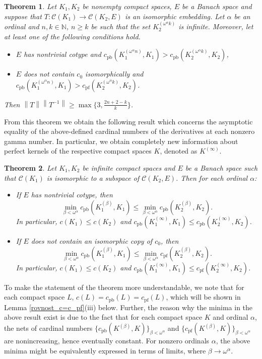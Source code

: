 \documentclass{amsart}
\numberwithin{equation}{section}
\newtheorem{thm}{Theorem}[section]
\theoremstyle{definition}
\def\C{\mathcal C}
\def\en{\mathbb N}
\newcommand{\norm}[1]{\left\|#1\right\|}
\begin{document}
\begin{thm}
\label{core}
Let $K_1, K_2$ be nonempty compact spaces, $E$ be a Banach space and suppose that $T:\C(K_1) \rightarrow \C(K_2, E)$ is an isomorphic embedding. Let $\alpha$ be an ordinal and $n, k \in \en$, $n \geq k$ be such that the set $K_2^{(\omega^{\alpha}k)}$ is infinite.
Moreover, let at least one of the following conditions hold. 
\begin{itemize}
    \item[(i)] $E$ has nontrivial cotype and $c_{\text{pb}}(K_1^{(\omega^{\alpha}n)}, K_1)>c_{\text{pb}}(K_2^{(\omega^{\alpha}k)}, K_2)$,
    \item[(ii)] $E$ does not contain $c_0$ isomorphically and $c_{\text{pb}}(K_1^{(\omega^{\alpha}n)}, K_1)>c_{\text{pf}}(K_2^{(\omega^{\alpha}k)}, K_2)$.
\end{itemize}
	Then $\norm{T}\norm{T^{-1}}\geq \max \{3, \frac{2n+2-k}{k}\}$.
\end{thm}

From this theorem we obtain the following result which concerns the asymptotic equality of the above-defined cardinal numbers of the derivatives at each nonzero gamma number. In particular, we obtain completely new information about perfect kernels of the respective compact spaces $K$, denoted as $K^{(\infty)}$. 

\begin{thm}
\label{main}
Let $K_1, K_2$ be infinite compact spaces and $E$ be a Banach space such that $\C(K_1)$ is isomorphic to a subspace of $\C(K_2, E)$. Then for each ordinal $\alpha$:
\begin{itemize}
    \item[(i)] If $E$ has nontrivial cotype, then 
    \[ \min_{\beta<\omega^{\alpha}} c_{\text{pb}}(K_1^{(\beta)}, K_1) \leq \min_{\beta<\omega^{\alpha}} c_{\text{pb}}(K_2^{(\beta)}, K_2) .\]
    In particular, $c(K_1) \leq c(K_2)$ and $c_{\text{pb}}(K_1^{(\infty)}, K_1) \leq c_{\text{pb}}(K_2^{(\infty)}, K_2)$.
    \item[(ii)] If $E$ does not contain an isomorphic copy of $c_0$, then 
    \[ \min_{\beta<\omega^{\alpha}} c_{\text{pb}}(K_1^{(\beta)}, K_1) \leq \min_{\beta<\omega^{\alpha}} c_{\text{pf}}(K_2^{(\beta)}, K_2) .\]
    In particular, $c(K_1) \leq c(K_2)$ and $c_{\text{pb}}(K_1^{(\infty)}, K_1) \leq c_{\text{pf}}(K_2^{(\infty)}, K_2)$.
\end{itemize}
\end{thm}

To make the statement of the theorem more understandable, we note that for each compact space $L$, $c(L)=c_{\text{pb}}(L)=c_{\text{pf}}(L)$, which will be shown in Lemma \ref{rovnost_c=c_pf}(iii) below. Further, the reason why the minima in the above result exist is due to the fact that for each compact space $K$ and ordinal $\alpha$, the nets of cardinal numbers $\{c_{\text{pb}}(K^{(\beta)}, K)\}_{\beta < \omega^{\alpha}}$ and $\{c_{\text{pf}}(K^{(\beta)}, K)\}_{\beta < \omega^{\alpha}}$ are nonincreasing, hence eventually constant. For nonzero ordinals $\alpha$, the above minima might be equivalently expressed in terms of limits, where $\beta \rightarrow \omega^{\alpha}$.
\end{document}
